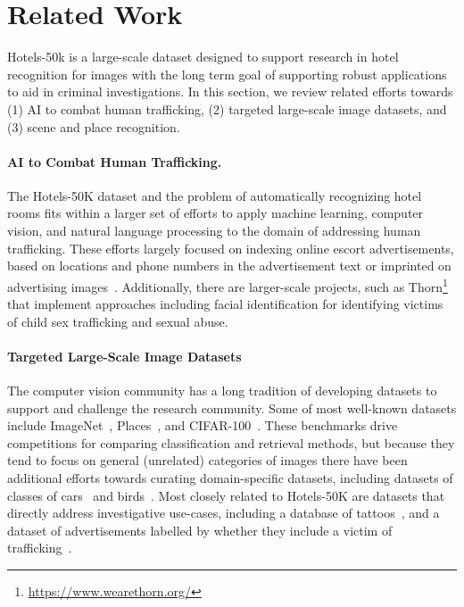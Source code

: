 \section{Related Work}
Hotels-50k is a large-scale dataset designed to support research in hotel recognition
for images with the long term goal of supporting robust applications to aid in criminal
investigations. In this section, we review related efforts towards (1) AI to combat human trafficking, (2) targeted large-scale image datasets, and (3) scene and place recognition.

\paragraph{AI to Combat Human Trafficking.} The Hotels-50K dataset and the problem of automatically recognizing hotel rooms fits within a larger set of efforts to apply machine learning, computer vision, and natural language processing to the domain of addressing human trafficking.  These efforts largely focused on indexing online escort advertisements, based on locations and phone numbers in the advertisement text or imprinted on advertising images~\cite{alvari2017semi,dubrawski2015leveraging,kejriwal2017investigative,szekely2015building}.  Additionally, there are larger-scale projects, such as Thorn\footnote{\url{https://www.wearethorn.org/}} that implement approaches including facial identification for identifying victims of child sex trafficking and sexual abuse.


\paragraph{Targeted Large-Scale Image Datasets} The computer vision community has a long tradition of developing datasets to support and challenge the research community. Some of most well-known datasets include ImageNet~\cite{deng2009imagenet}, Places~\cite{zhou2017places}, and CIFAR-100~\cite{krizhevsky2009learning}.
These benchmarks drive competitions for comparing classification and retrieval methods, but because they tend to focus on general (unrelated) categories of images there have been additional efforts towards curating domain-specific datasets, including datasets of classes of cars~\cite{CAR196} and birds~\cite{wah2011caltech}.  Most closely related to Hotels-50K are datasets that directly address investigative use-cases, including a database of tattoos~\cite{ngan2015tattoo}, and a dataset of advertisements labelled by whether they include a victim of trafficking~\cite{tong2017combating}. 

